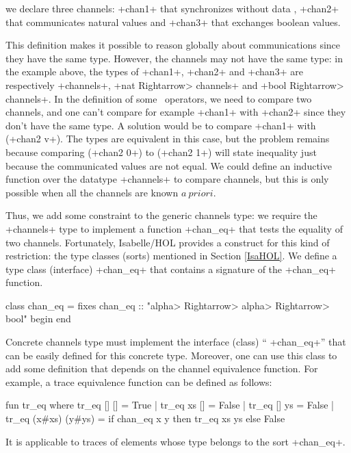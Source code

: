 \documentclass[11pt,a4paper]{article}
\begin{document}
\noindent we declare three channels: \inlineisar+chan1+ that synchronizes without data , \inlineisar+chan2+ that communicates natural values and \inlineisar+chan3+ that exchanges boolean values.

This definition %
makes it possible to reason globally about communications since they have the same type. 
However, the channels may not have the same type:
in the example above, the types of \inlineisar+chan1+, \inlineisar+chan2+ and \inlineisar+chan3+ are respectively \inlineisar+channels+, \inlineisar+nat \<Rightarrow> channels+ and \inlineisar+bool \<Rightarrow> channels+. 
In the definition of some \Circus\ operators, we need to compare two channels, 
and one can't compare for example \inlineisar+chan1+ with \inlineisar+chan2+ since they don't have the same type. A solution would be to compare %
\inlineisar+chan1+ with (\inlineisar+chan2 v+). The types are equivalent in this case, but the problem remains because comparing (\inlineisar+chan2 0+) to (\inlineisar+chan2 1+) will state inequality just because the communicated values are not equal. We could define an inductive function over the datatype \inlineisar+channels+ to compare channels, but this is only possible when all the channels are known $a~priori$. 

Thus,  %
we add some constraint to the generic channels type: we require the \inlineisar+channels+ type to implement a function \inlineisar+chan_eq+ that tests the equality of two channels.
Fortunately, Isabelle/HOL provides a %
construct for this kind of restriction: the type classes (sorts) mentioned in Section \ref{IsaHOL}. We define a type class (interface) \inlineisar+chan_eq+ that contains a signature of the \inlineisar+chan_eq+ function.
\begin{isar}
class chan_eq = 
  fixes chan_eq :: "\<alpha> \<Rightarrow>  \<alpha>  \<Rightarrow> bool"
begin end
\end{isar}
Concrete channels type %
must implement the interface (class) `` \inlineisar+chan_eq+'' that can be easily defined for this concrete type. Moreover, one can use this class to add some definition that depends on the channel equivalence function. For example, a trace equivalence function can be defined as follows:
\begin{isar}
fun tr_eq where
  tr_eq [] [] = True | tr_eq xs [] = False | tr_eq [] ys = False
| tr_eq (x#xs) (y#ys) = if chan_eq x y then tr_eq xs ys else False
\end{isar}
It is applicable to traces of elements whose type belongs to the sort \inlineisar+chan_eq+.
\end{document}
